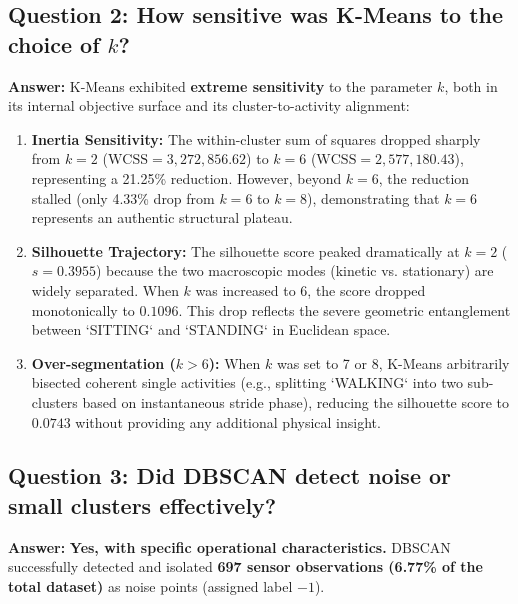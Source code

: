 \documentclass[12pt,a4paper]{article}
\begin{document}
\subsection{Question 2: How sensitive was K-Means to the choice of \texorpdfstring{$k$}{k}?}
\textbf{Answer:}
K-Means exhibited \textbf{extreme sensitivity} to the parameter $k$, both in its internal objective surface and its cluster-to-activity alignment:
\begin{enumerate}[noitemsep]
    \item \textbf{Inertia Sensitivity:} The within-cluster sum of squares dropped sharply from $k=2$ ($\text{WCSS} = 3,272,856.62$) to $k=6$ ($\text{WCSS} = 2,577,180.43$), representing a 21.25\% reduction. However, beyond $k=6$, the reduction stalled (only 4.33\% drop from $k=6$ to $k=8$), demonstrating that $k=6$ represents an authentic structural plateau.
    \item \textbf{Silhouette Trajectory:} The silhouette score peaked dramatically at $k=2$ ($s = 0.3955$) because the two macroscopic modes (kinetic vs. stationary) are widely separated. When $k$ was increased to 6, the score dropped monotonically to $0.1096$. This drop reflects the severe geometric entanglement between `SITTING` and `STANDING` in Euclidean space.
    \item \textbf{Over-segmentation ($k > 6$):} When $k$ was set to 7 or 8, K-Means arbitrarily bisected coherent single activities (e.g., splitting `WALKING` into two sub-clusters based on instantaneous stride phase), reducing the silhouette score to $0.0743$ without providing any additional physical insight.
\end{enumerate}

\subsection{Question 3: Did DBSCAN detect noise or small clusters effectively?}
\textbf{Answer:}
\textbf{Yes, with specific operational characteristics.} 
DBSCAN successfully detected and isolated \textbf{697 sensor observations (6.77\% of the total dataset)} as noise points (assigned label $-1$).
\end{document}
